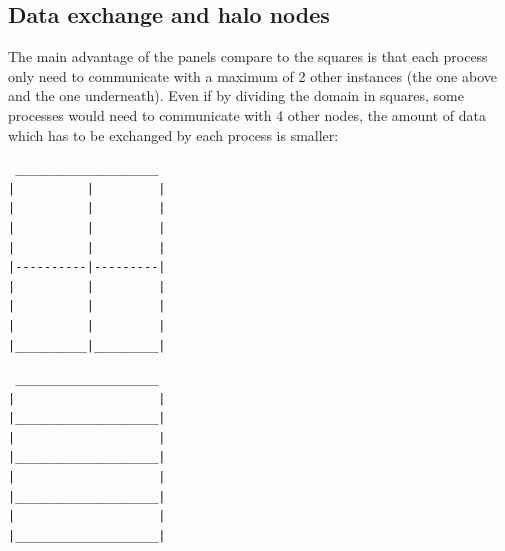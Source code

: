 \documentclass[a4paper,11pt]{article}
\begin{document}
\subsection{Data exchange and halo nodes}

The main advantage of the panels compare to the squares is that each process only need to
communicate with a maximum of 2 other instances (the one above and the one underneath).
Even if by dividing the domain in squares, some processes would need to communicate with
4 other nodes, the amount of data which has to be exchanged by each process is smaller:

\begin{multicols}{2}
\begin{verbatim}
 ____________________
|          |         |
|          |         |
|          |         |
|          |         |
|----------|---------|
|          |         |
|          |         |
|          |         |
|__________|_________|
\end{verbatim}
\begin{verbatim}
 ____________________
|                    |
|____________________|
|                    |
|____________________|
|                    |
|____________________|
|                    |
|____________________|
\end{verbatim}
\end{multicols}
\end{document}
